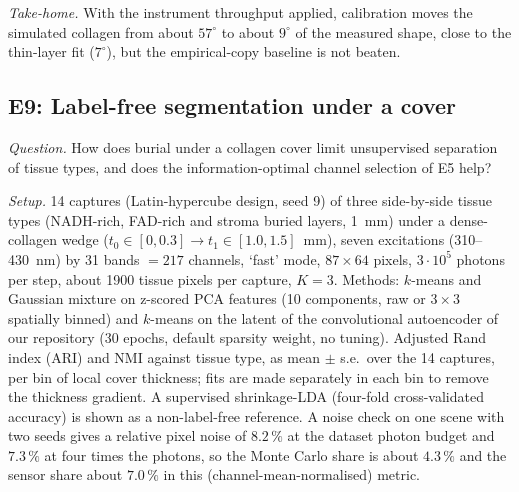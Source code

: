 \documentclass[journal]{IEEEtran}
\begin{document}
\emph{Take-home.} With the instrument throughput applied, calibration moves the simulated collagen from about $57^\circ$ to about $9^\circ$ of the measured shape, close to the thin-layer fit ($7^\circ$), but the empirical-copy baseline is not beaten.

\subsection{E9: Label-free segmentation under a cover}
\emph{Question.} How does burial under a collagen cover limit unsupervised separation of tissue types, and does the information-optimal channel selection of E5 help?

\emph{Setup.} 14 captures (Latin-hypercube design, seed 9) of three side-by-side tissue types (NADH-rich, FAD-rich and stroma buried layers, 1~mm) under a dense-collagen wedge ($t_0\in[0,0.3]\to t_1\in[1.0,1.5]$~mm), seven excitations (310--430~nm) by 31 bands $=217$ channels, `fast' mode, $87\times64$ pixels, $3\cdot10^5$ photons per step, about 1900 tissue pixels per capture, $K=3$. Methods: $k$-means and Gaussian mixture on z-scored PCA features (10 components, raw or $3\times3$ spatially binned) and $k$-means on the latent of the convolutional autoencoder of our repository (30 epochs, default sparsity weight, no tuning). Adjusted Rand index (ARI) and NMI against tissue type, as mean $\pm$ s.e.\ over the 14 captures, per bin of local cover thickness; fits are made separately in each bin to remove the thickness gradient. A supervised shrinkage-LDA (four-fold cross-validated accuracy) is shown as a non-label-free reference. A noise check on one scene with two seeds gives a relative pixel noise of $8.2\,\%$ at the dataset photon budget and $7.3\,\%$ at four times the photons, so the Monte Carlo share is about $4.3\,\%$ and the sensor share about $7.0\,\%$ in this (channel-mean-normalised) metric.
\end{document}

